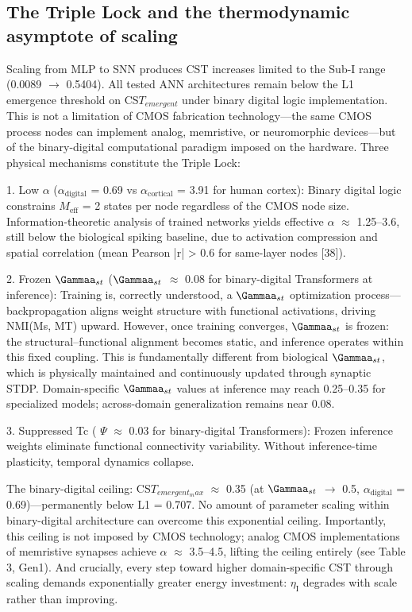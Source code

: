 \documentclass[a4paper,12pt]{article}
\begin{document}
\subsection{The Triple Lock and the thermodynamic asymptote of scaling}

Scaling from MLP to SNN produces CST increases limited to the Sub-I range (0.0089  $\rightarrow$  0.5404).
All tested ANN architectures remain below the L1 emergence threshold on CS$T_{emergent}$ under binary digital logic implementation.
This is not a limitation of CMOS fabrication technology---the same CMOS process nodes can implement analog, memristive, or neuromorphic devices---but of the binary-digital computational paradigm imposed on the hardware.
Three physical mechanisms constitute the Triple Lock:

1. Low  $\alpha$  ($\alpha_{\text{digital}}$ = 0.69 vs $\alpha_{\text{cortical}}$ = 3.91 for human cortex): Binary digital logic constrains $M_{\text{eff}}$ = 2 states per node regardless of the CMOS node size. Information-theoretic analysis of trained networks yields effective  $\alpha$   $\approx$  1.25--3.6, still below the biological spiking baseline, due to activation compression and spatial correlation (mean Pearson |r| > 0.6 for same-layer nodes [38]).

2.
Frozen $\Gammaa_{st}$ ($\Gammaa_{st}$  $\approx$  0.08 for binary-digital Transformers at inference): Training is, correctly understood, a $\Gammaa_{st}$ optimization process---backpropagation aligns weight structure with functional activations, driving NMI(Ms, MT) upward.
However, once training converges, $\Gammaa_{st}$ is frozen: the structural--functional alignment becomes static, and inference operates within this fixed coupling.
This is fundamentally different from biological $\Gammaa_{st}$, which is physically maintained and continuously updated through synaptic STDP.
Domain-specific $\Gammaa_{st}$ values at inference may reach 0.25--0.35 for specialized models; across-domain generalization remains near 0.08.

3. Suppressed Tc ( $\Psi$   $\approx$  0.03 for binary-digital Transformers): Frozen inference weights eliminate functional connectivity variability. Without inference-time plasticity, temporal dynamics collapse.

The binary-digital ceiling: CS$T_{emergent_max}$  $\approx$  0.35 (at $\Gammaa_{st}$  $\rightarrow$  0.5, $\alpha_{\text{digital}}$ = 0.69)---permanently below L1 = 0.707.
No amount of parameter scaling within binary-digital architecture can overcome this exponential ceiling.
Importantly, this ceiling is not imposed by CMOS technology; analog CMOS implementations of memristive synapses achieve  $\alpha$   $\approx$  3.5--4.5, lifting the ceiling entirely (see Table 3, Gen1).
And crucially, every step toward higher domain-specific CST through scaling demands exponentially greater energy investment: $\eta_{\text{I}}$ degrades with scale rather than improving.
\end{document}
